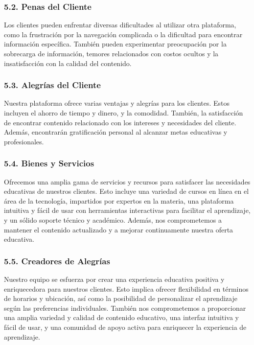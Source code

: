 \documentclass[
]{article}
\begin{document}
\subsubsection{5.2. Penas del Cliente}\label{penas-del-cliente}

Los clientes pueden enfrentar diversas dificultades al utilizar otra
plataforma, como la frustración por la navegación complicada o la
dificultad para encontrar información específica. También pueden
experimentar preocupación por la sobrecarga de información, temores
relacionados con costos ocultos y la insatisfacción con la calidad del
contenido.

\subsubsection{5.3. Alegrías del Cliente}\label{alegruxedas-del-cliente}

Nuestra plataforma ofrece varias ventajas y alegrías para los clientes.
Estos incluyen el ahorro de tiempo y dinero, y la comodidad. También, la
satisfacción de encontrar contenido relacionado con los intereses y
necesidades del cliente. Además, encontrarán gratificación personal al
alcanzar metas educativas y profesionales.

\subsubsection{5.4. Bienes y Servicios}\label{bienes-y-servicios}

Ofrecemos una amplia gama de servicios y recursos para satisfacer las
necesidades educativas de nuestros clientes. Esto incluye una variedad
de cursos en línea en el área de la tecnología, impartidos por expertos
en la materia, una plataforma intuitiva y fácil de usar con herramientas
interactivas para facilitar el aprendizaje, y un sólido soporte técnico
y académico. Además, nos comprometemos a mantener el contenido
actualizado y a mejorar continuamente nuestra oferta educativa.

\subsubsection{5.5. Creadores de
Alegrías}\label{creadores-de-alegruxedas}

Nuestro equipo se esfuerza por crear una experiencia educativa positiva
y enriquecedora para nuestros clientes. Esto implica ofrecer
flexibilidad en términos de horarios y ubicación, así como la
posibilidad de personalizar el aprendizaje según las preferencias
individuales. También nos comprometemos a proporcionar una amplia
variedad y calidad de contenido educativo, una interfaz intuitiva y
fácil de usar, y una comunidad de apoyo activa para enriquecer la
experiencia de aprendizaje.
\end{document}
